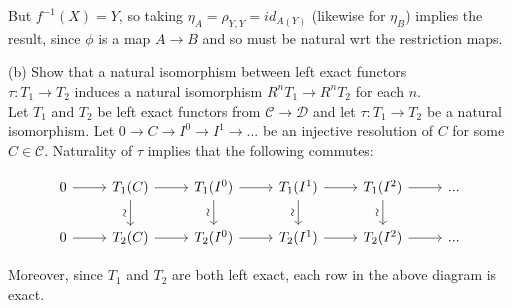 But $f^{-1}(X) = Y$, so taking $\eta_A = \rho_{Y, Y} = id_{A(Y)}$ (likewise for $\eta_B$) implies the result, since $\phi$ is a map $A \rightarrow B$ and so must be natural wrt the restriction maps.

 (b) Show that a natural isomorphism between left exact functors \\
$\tau: T_1 \rightarrow  T_2$ induces a natural isomorphism $R^nT_1 \rightarrow R^nT_2$ for each $n$.\\

Let $T_1$ and $T_2$ be left exact functors from $\mathcal{C} \rightarrow \mathcal{D}$ and let $\tau: T_1 \rightarrow T_2$ be a natural isomorphism. Let $0 \rightarrow C \rightarrow I^0 \rightarrow I^1 \rightarrow ...$ be an injective resolution of $C$ for some $C \in \mathcal{C}$. Naturality of $\tau$ implies that the following commutes:

\[
\begin{tikzcd}
0 \arrow[r] 
& T_1(C) \arrow[r] \arrow[d, "\rotatebox{90}{\(\sim\)}"']
& T_1(I^0) \arrow[r] \arrow[d, "\rotatebox{90}{\(\sim\)}"']
& T_1(I^1) \arrow[r] \arrow[d, "\rotatebox{90}{\(\sim\)}"']
& T_1(I^2) \arrow[r] \arrow[d, "\rotatebox{90}{\(\sim\)}"']
& ...
\\
0 \arrow[r]
& T_2(C) \arrow[r]
& T_2(I^0) \arrow[r]
& T_2(I^1) \arrow[r]
& T_2(I^2) \arrow[r]
& ...
\end{tikzcd}
\]

Moreover, since $T_1$ and $T_2$ are both left exact, each row in the above diagram is exact. 

